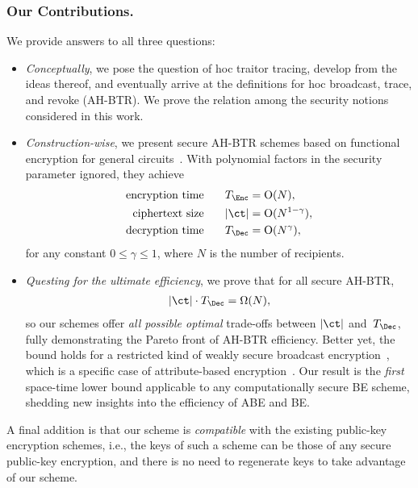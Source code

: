 \subsubsection{Our Contributions.}
We provide answers to all three questions:
\begin{itemize}
\item \emph{Conceptually}, we pose the question of \ad hoc traitor tracing,
develop from the ideas thereof, and
eventually arrive at the definitions for \ad hoc broadcast, trace, and revoke (AH-BTR)\@.
We prove the relation among the security notions considered in this work.
\item \emph{Construction-wise},
we present secure AH-BTR schemes based on functional encryption for general circuits~\cite{TCC:BonSahWat11}.
With polynomial factors in the security parameter ignored,
they achieve
\begin{align*}
\textup{encryption time}\qquad\qquad\mathllap{T_\Enc}&{}=\bigO(N),\\
\textup{ciphertext size}\qquad\qquad\mathllap{|\ct|}&{}=\bigO(N^{1-\gamma}),\\
\textup{decryption time}\qquad\qquad\mathllap{T_\Dec}&{}=\bigO(N^\gamma),
\end{align*}
for any constant ${0\leq\gamma\leq 1}$,
where $N$ is the number of recipients.
\item \emph{Questing for the ultimate efficiency},
we prove that for all secure AH-BTR,
\begin{align*}
|\ct|\cdot T_\Dec=\bigOmega(N),
\end{align*}
so our schemes offer \emph{all possible optimal} trade-offs between $|\ct|$ and~$T_\Dec$,
fully demonstrating the Pareto front of AH-BTR efficiency.
Better yet, the bound holds for a restricted kind of weakly secure broadcast encryption~\cite{C:FiaNao93},
which is a specific case of attribute-based encryption~\cite{EC:SahWat05,CCS:GPSW06}.
Our result is the \emph{first} space-time lower bound applicable to any computationally secure BE scheme,
shedding new insights into the efficiency of ABE and BE\@.
\end{itemize}
A final addition is that our scheme is \emph{compatible} with the existing public-key encryption schemes,
i.e., the keys of such a scheme can be those of any secure public-key encryption, and
there is no need to regenerate keys to take advantage of our scheme.

